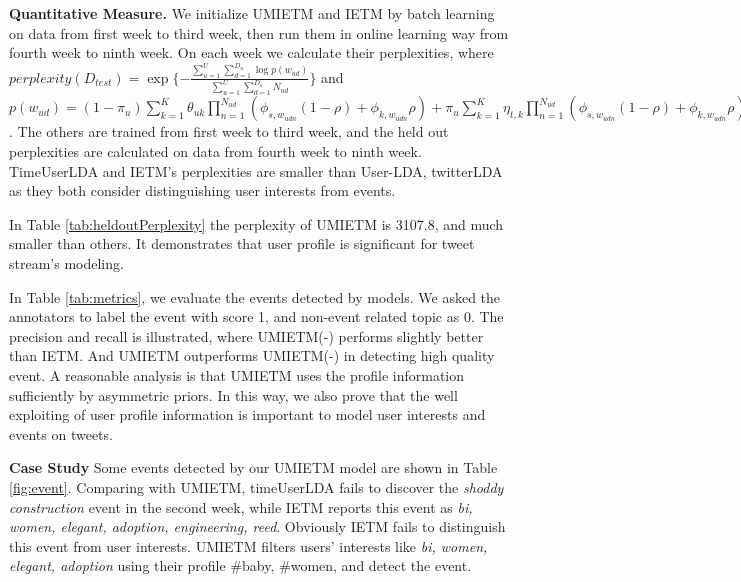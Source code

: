 \documentclass{llncs}
\begin{document}
\textbf{Quantitative Measure.}
We initialize UMIETM and IETM by batch learning on data from first week to third week, then run them in online learning way from fourth week to ninth week.
On each week we calculate their perplexities\cite{wallach2009evaluation}, where \(perplexity(D_{test})=\exp{\{-\frac{\sum_{u=1}^{U}\sum_{d=1}^{D_u}\log{p(w_{ud})}}{\sum_{u=1}^{U}\sum_{d=1}^{D_u}N_{ud}}\}}\) and \(p(w_{ud})=(1-\pi_u)\sum_{k=1}^{K}\theta_{uk}\prod_{n=1}^{N_{ud}}(\phi_{s,w_{udn}}(1-\rho)+\phi_{k,w_{udn}}\rho)+\pi_u \sum_{k=1}^{K}\eta_{t,k}\prod_{n=1}^{N_{ud}}(\phi_{s,w_{udn}}(1-\rho)+\phi_{k,w_{udn}}\rho)\).
The others are trained from first week to third week, and the held out perplexities are calculated on data from fourth week to ninth week.
TimeUserLDA and IETM's perplexities are smaller than User-LDA, twitterLDA as they both consider distinguishing user interests from events.

In Table \ref{tab:heldoutPerplexity} the perplexity of UMIETM is 3107.8, and much smaller than others. It demonstrates that user profile is significant for tweet stream's modeling.

In Table \ref{tab:metrics}, we evaluate the events detected by models. We asked the annotators to label the event with score 1, and non-event related topic as 0. 
The precision and recall is illustrated, where UMIETM(-) performs slightly better than IETM. 
And UMIETM outperforms UMIETM(-) in detecting high quality event. 
A reasonable analysis is that UMIETM uses the profile information sufficiently by asymmetric priors\cite{wallach2009rethinking}. 
In this way, we also prove that the well exploiting of user profile information is important to model user interests and events on tweets. 

\textbf{Case Study} 
Some events detected by our UMIETM model are shown in Table \ref{fig:event}.
Comparing with UMIETM, timeUserLDA fails to discover the \textit{shoddy construction} event in the second week, while IETM reports this event as \textit{bi, women, elegant, adoption, engineering, reed}. Obviously IETM fails to distinguish this event from user interests.
UMIETM filters users' interests like \textit{bi, women, elegant, adoption} using their profile {\#baby, \#women}, and detect the event.
\end{document}
